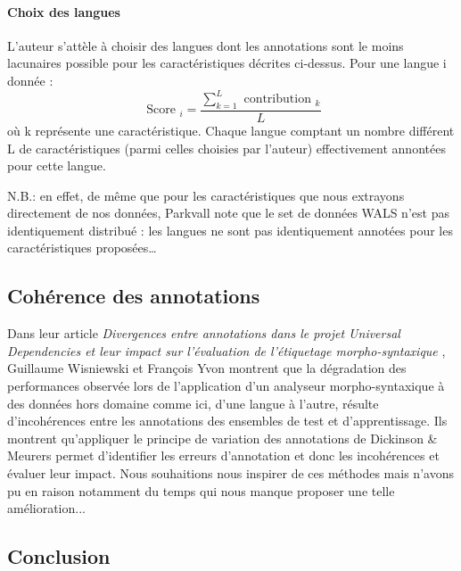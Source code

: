 \documentclass[a4paper, twoside]{article}
\begin{document}
    \paragraph{Choix des langues}

    L’auteur s’attèle à choisir des langues dont les annotations sont le moins lacunaires possible pour les caractéristiques décrites ci-dessus. Pour une langue i donnée :
    \begin{equation}
    \text { Score }_{i}=\frac{\sum_{k=1}^{L} \text { contribution }_{k}}{L}
    \end{equation}
    où k représente une caractéristique. Chaque langue comptant un nombre différent L de caractéristiques (parmi celles choisies par l'auteur) effectivement annontées pour cette langue. \par
    N.B.: en effet, de même que pour les caractéristiques que nous extrayons directement de nos données, Parkvall note que le set de données WALS n’est pas identiquement distribué : les langues ne sont pas identiquement annotées pour les caractéristiques proposées…

    \subsection{Cohérence des annotations}

    Dans leur article \textit{Divergences entre annotations dans le projet Universal Dependencies \cite{nivre} et leur impact sur l’évaluation de l’étiquetage morpho-syntaxique} \cite{wisniewski}, Guillaume Wisniewski et François Yvon montrent que la dégradation des performances observée lors de l’application d’un analyseur morpho-syntaxique à des données hors domaine comme ici, d'une langue à l'autre, résulte d’incohérences entre les annotations des ensembles de test et d’apprentissage. Ils montrent qu'appliquer le principe de variation des annotations de Dickinson \& Meurers \cite{meueres} permet d'identifier les erreurs d’annotation et donc les incohérences et évaluer leur impact. Nous souhaitions nous inspirer de ces méthodes mais n'avons pu en raison notamment du temps qui nous manque proposer une telle amélioration...

    \subsection{Conclusion}

\end{document}
